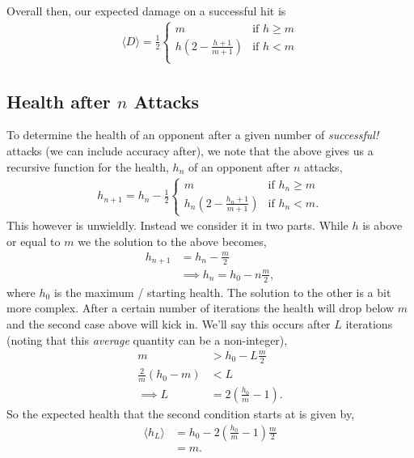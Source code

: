 \documentclass[../../main.tex]{subfiles}
\begin{document}
			Overall then, our expected damage on a successful hit is
			\begin{align}
				\boxed{
					\langle D \rangle = \frac{1}{2}\begin{cases}
						m &\text{if $h \ge m$} \\
						h\left(2 - \frac{h + 1}{m+1}\right) &\text{if $h < m$} \\
					\end{cases}
				}
			\end{align}
		\subsection{Health after $n$ Attacks}
			To determine the health of an opponent after a given number of \textit{successful!} attacks (we can include accuracy after), we note that the above gives us a recursive function for the health, $h_n$ of an opponent after $n$ attacks,
			\begin{align}
				h_{n+1} = h_{n} - \frac{1}{2}\begin{cases}
					m &\text{if $h_n \ge m$} \\
					h_n\left(2 - \frac{h_n + 1}{m+1}\right) &\text{if $h_n < m$}.
				\end{cases}
			\end{align}
			This however is unwieldly. Instead we consider it in two parts. While $h$ is above or equal to $m$ we the solution to the above becomes,
			\begin{align}
				h_{n+1} &= h_{n} - \frac{m}{2} \\
				&\implies h_n = h_0 - n\frac{m}{2},\label{eq:h_crude}
			\end{align}
			where $h_0$ is the maximum / starting health. The solution to the other is a bit more complex. After a certain number of iterations the health will drop below $m$ and the second case above will kick in. We'll say this occurs after $L$ iterations (noting that this \emph{average} quantity can be a non-integer),
			\begin{align}
				m &> h_0 - L\frac{m}{2} \\
				\frac{2}{m}(h_0 - m) &< L \\
				\implies L &= 2\left(\frac{h_0}{m} - 1\right).
			\end{align}
			So the expected health that the second condition starts at is given by,
			\begin{align}
				\langle h_L \rangle &= h_0 - 2\left(\frac{h_0}{m} - 1\right) \frac{m}{2}\\
				&= m.
			\end{align}
\end{document}
